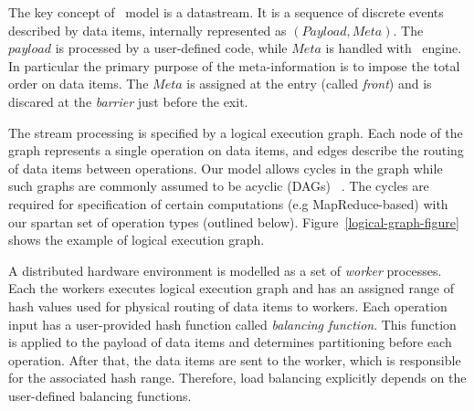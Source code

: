 
\label {fs-model}

The key concept of \FlameStream\ model is a datastream. It is a sequence of discrete events described by data items, internally represented as 
$(Payload, Meta).$
The $payload$ is processed by a  user-defined code, while $Meta$ is handled with \FlameStream\ engine. In particular
the primary purpose of the meta-information is to impose the total order on data items. 
The  $Meta$ is assigned at the entry (called {\em  front}) and is discared at the {\em barrier} just before the exit. 

The stream processing is specified by a logical execution graph. 
Each node of the graph represents a single operation on data items, and edges describe the routing of data items between operations.  
Our model allows cycles in the graph while such graphs are commonly assumed to be acyclic (DAGs) 
~\cite{Zaharia:2016:ASU:3013530.2934664, Carbone:2017:SMA:3137765.3137777}. 
The cycles are required for specification of certain computations (e.g MapReduce-based) with our spartan set of operation types (outlined below).
Figure~\ref{logical-graph-figure} shows the example of logical execution graph.

A distributed hardware environment is modelled as a set of {\em worker} processes. 
Each the workers executes logical execution graph and has an assigned range of hash values used for physical routing of data items to workers. 
%
Each operation input has a user-provided hash function called {\it balancing function}. This function is applied to the payload of data items and determines partitioning before each operation. After that, the data items are sent to the worker, which is responsible for the associated hash range. Therefore, load balancing explicitly depends on the user-defined balancing functions. 

